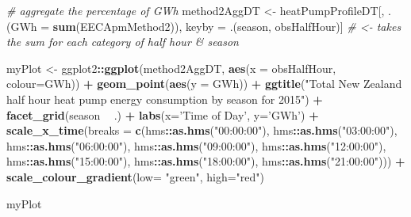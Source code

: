 \documentclass[]{article}
\newenvironment{Shaded}{\begin{snugshade}}{\end{snugshade}}
\newcommand{\KeywordTok}[1]{\textcolor[rgb]{0.13,0.29,0.53}{\textbf{#1}}}
\newcommand{\DataTypeTok}[1]{\textcolor[rgb]{0.13,0.29,0.53}{#1}}
\newcommand{\StringTok}[1]{\textcolor[rgb]{0.31,0.60,0.02}{#1}}
\newcommand{\CommentTok}[1]{\textcolor[rgb]{0.56,0.35,0.01}{\textit{#1}}}
\newcommand{\OperatorTok}[1]{\textcolor[rgb]{0.81,0.36,0.00}{\textbf{#1}}}
\newcommand{\NormalTok}[1]{#1}
\theoremstyle{definition}
\theoremstyle{definition}
\theoremstyle{definition}
\theoremstyle{remark}
\begin{document}
\begin{Shaded}
\begin{Highlighting}[]
\CommentTok{# aggregate the percentage of GWh}
\NormalTok{method2AggDT <-}\StringTok{ }\NormalTok{heatPumpProfileDT[, .(}\DataTypeTok{GWh =} \KeywordTok{sum}\NormalTok{(EECApmMethod2)), }
\NormalTok{                                  keyby =}\StringTok{ }\NormalTok{.(season, obsHalfHour)] }\CommentTok{# <- takes the sum for each category of half hour & season}

\NormalTok{myPlot <-}\StringTok{ }\NormalTok{ggplot2}\OperatorTok{::}\KeywordTok{ggplot}\NormalTok{(method2AggDT, }\KeywordTok{aes}\NormalTok{(}\DataTypeTok{x =}\NormalTok{ obsHalfHour, }\DataTypeTok{colour=}\NormalTok{GWh)) }\OperatorTok{+}
\StringTok{  }\KeywordTok{geom_point}\NormalTok{(}\KeywordTok{aes}\NormalTok{(}\DataTypeTok{y =}\NormalTok{ GWh)) }\OperatorTok{+}
\StringTok{  }\KeywordTok{ggtitle}\NormalTok{(}\StringTok{"Total New Zealand half hour heat pump energy consumption by season for 2015"}\NormalTok{) }\OperatorTok{+}
\StringTok{  }\KeywordTok{facet_grid}\NormalTok{(season }\OperatorTok{~}\StringTok{ }\NormalTok{.) }\OperatorTok{+}
\StringTok{  }\KeywordTok{labs}\NormalTok{(}\DataTypeTok{x=}\StringTok{'Time of Day'}\NormalTok{, }\DataTypeTok{y=}\StringTok{'GWh'}\NormalTok{) }\OperatorTok{+}
\StringTok{  }\KeywordTok{scale_x_time}\NormalTok{(}\DataTypeTok{breaks =} \KeywordTok{c}\NormalTok{(hms}\OperatorTok{::}\KeywordTok{as.hms}\NormalTok{(}\StringTok{"00:00:00"}\NormalTok{), hms}\OperatorTok{::}\KeywordTok{as.hms}\NormalTok{(}\StringTok{"03:00:00"}\NormalTok{), hms}\OperatorTok{::}\KeywordTok{as.hms}\NormalTok{(}\StringTok{"06:00:00"}\NormalTok{), hms}\OperatorTok{::}\KeywordTok{as.hms}\NormalTok{(}\StringTok{"09:00:00"}\NormalTok{), hms}\OperatorTok{::}\KeywordTok{as.hms}\NormalTok{(}\StringTok{"12:00:00"}\NormalTok{), }
\NormalTok{                          hms}\OperatorTok{::}\KeywordTok{as.hms}\NormalTok{(}\StringTok{"15:00:00"}\NormalTok{), hms}\OperatorTok{::}\KeywordTok{as.hms}\NormalTok{(}\StringTok{"18:00:00"}\NormalTok{), hms}\OperatorTok{::}\KeywordTok{as.hms}\NormalTok{(}\StringTok{"21:00:00"}\NormalTok{))) }\OperatorTok{+}
\KeywordTok{scale_colour_gradient}\NormalTok{(}\DataTypeTok{low=} \StringTok{"green"}\NormalTok{, }\DataTypeTok{high=}\StringTok{"red"}\NormalTok{)}

\NormalTok{myPlot}
\end{Highlighting}
\end{Shaded}
\end{document}
